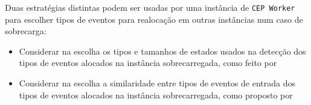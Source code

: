 Duas estratégias distintas podem ser usadas por uma instância de \texttt{CEP Worker} para escolher tipos de eventos para realocação em outras instâncias num caso de sobrecarga: 
\begin{itemize}
   
    \item Considerar na escolha os tipos e tamanhos de estados usados na detecção dos tipos de eventos alocados na instância sobrecarregada, como feito por \cite{6906776}%
    
    
     \item Considerar na escolha a similaridade entre tipos de eventos de entrada dos tipos de eventos alocados na instância sobrecarregada, como proposto por \cite{Isoyama:2012:SCE:2335484.2335498}
     

\end{itemize}

